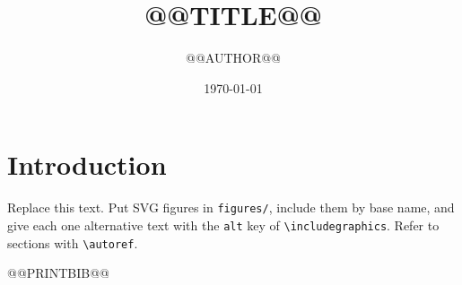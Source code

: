 \documentclass[@@SIZE@@,@@PAPER@@]{@@CLASS@@}
\title{@@TITLE@@}
\author{@@AUTHOR@@}
\date{\today}
\begin{document}
\maketitle

\section{Introduction}
\label{sec:intro}
Replace this text. Put SVG figures in \texttt{figures/}, include them by base
name, and give each one alternative text with the \texttt{alt} key of
\texttt{\textbackslash includegraphics}. Refer to sections with
\texttt{\textbackslash autoref}.

@@PRINTBIB@@
\end{document}
